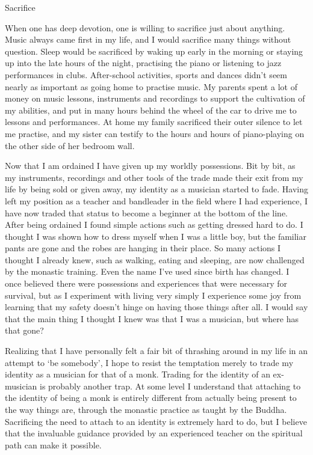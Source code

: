 Sacrifice

When one has deep devotion, one is willing to sacrifice just about
anything. Music always came first in my life, and I would sacrifice many
things without question. Sleep would be sacrificed by waking up early in
the morning or staying up into the late hours of the night, practising
the piano or listening to jazz performances in clubs. After-school
activities, sports and dances didn't seem nearly as important as going
home to practise music. My parents spent a lot of money on music
lessons, instruments and recordings to support the cultivation of my
abilities, and put in many hours behind the wheel of the car to drive me
to lessons and performances. At home my family sacrificed their outer
silence to let me practise, and my sister can testify to the hours and
hours of piano-playing on the other side of her bedroom wall.

Now that I am ordained I have given up my worldly possessions. Bit by
bit, as my instruments, recordings and other tools of the trade made
their exit from my life by being sold or given away, my identity as a
musician started to fade. Having left my position as a teacher and
bandleader in the field where I had experience, I have now traded that
status to become a beginner at the bottom of the line. After being
ordained I found simple actions such as getting dressed hard to do. I
thought I was shown how to dress myself when I was a little boy, but the
familiar pants are gone and the robes are hanging in their place. So
many actions I thought I already knew, such as walking, eating and
sleeping, are now challenged by the monastic training. Even the name
I've used since birth has changed. I once believed there were
possessions and experiences that were necessary for survival, but as I
experiment with living very simply I experience some joy from learning
that my safety doesn't hinge on having those things after all. I would
say that the main thing I thought I knew was that I was a musician, but
where has that gone?

Realizing that I have personally felt a fair bit of thrashing around in
my life in an attempt to `be somebody', I hope to resist the temptation
merely to trade my identity as a musician for that of a monk. Trading
for the identity of an ex-musician is probably another trap. At some
level I understand that attaching to the identity of being a monk is
entirely different from actually being present to the way things are,
through the monastic practice as taught by the Buddha. Sacrificing the
need to attach to an identity is extremely hard to do, but I believe
that the invaluable guidance provided by an experienced teacher on the
spiritual path can make it possible.


